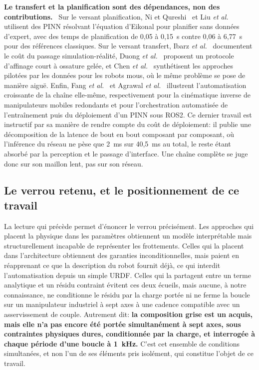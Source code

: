 \documentclass[a4paper, oneside]{article}
\newcommand{\parag}[1]{%
    \par\medskip\noindent\textbf{#1}\ \ignorespaces%
}
\begin{document}
\parag{Le transfert et la planification sont des dépendances, non des
contributions.} Sur le versant planification, Ni et Qureshi~\cite{ni2024} et
Liu \emph{et al.}~\cite{liu2024ntfields} utilisent des PINN résolvant
l'équation d'Eikonal pour planifier sans données d'expert, avec des temps de
planification de 0{,}05 à 0{,}15~s contre 0{,}06 à 6{,}77~s pour des références
classiques. Sur le versant transfert, Ibarz \emph{et al.}~\cite{ibarz2021}
documentent le coût du passage simulation-réalité,
Duong \emph{et al.}~\cite{duong2024} proposent un protocole d'affinage court à
ossature gelée, et Chen \emph{et al.}~\cite{chen2025soft} synthétisent les
approches pilotées par les données pour les robots mous, où le même problème se
pose de manière aiguë. Enfin, Fang \emph{et al.}~\cite{fang2026} et
Agrawal \emph{et al.}~\cite{agrawal2026} illustrent l'automatisation croissante
de la chaîne elle-même, respectivement pour la cinématique inverse de
manipulateurs mobiles redondants et pour l'orchestration automatisée de
l'entraînement puis du déploiement d'un PINN sous ROS2. Ce dernier travail est
instructif par sa manière de rendre compte du coût de déploiement: il publie
une décomposition de la latence de bout en bout composant par composant, où
l'inférence du réseau ne pèse que 2~ms sur 40{,}5~ms au total, le reste étant
absorbé par la perception et le passage d'interface. Une chaîne complète se juge
donc sur son maillon lent, pas sur son réseau.

\subsection{Le verrou retenu, et le positionnement de ce travail}
\label{sec:sota-gap}

La lecture qui précède permet d'énoncer le verrou précisément. Les approches qui
placent la physique dans les paramètres obtiennent un modèle interprétable mais
structurellement incapable de représenter les frottements. Celles qui la
placent dans l'architecture obtiennent des garanties inconditionnelles, mais
paient en réapprenant ce que la description du robot fournit déjà, ce qui
interdit l'automatisation depuis un simple URDF. Celles qui la partagent entre
un terme analytique et un résidu contraint évitent ces deux écueils, mais
aucune, à notre connaissance, ne conditionne le résidu par la charge portée ni
ne ferme la boucle sur un manipulateur industriel à sept axes à une cadence
compatible avec un asservissement de couple. Autrement dit: \textbf{la
composition grise est un acquis, mais elle n'a pas encore été portée
simultanément à sept axes, sous contraintes physiques dures, conditionnée par la
charge, et interrogée à chaque période d'une boucle à \SI{1}{kHz}.} C'est cet
ensemble de conditions simultanées, et non l'un de ses éléments pris isolément,
qui constitue l'objet de ce travail.
\end{document}
